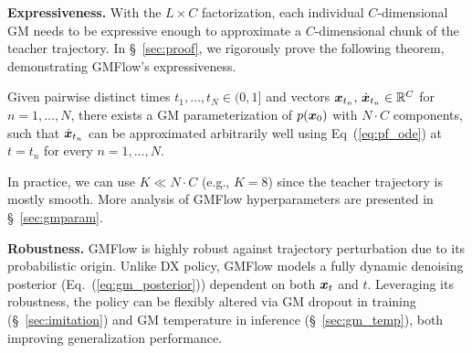 \textbf{Expressiveness.}
With the $L\times C$ factorization, each individual $C$-dimensional GM needs to be expressive enough to approximate a $C$-dimensional chunk of the teacher trajectory.
In \S~\ref{sec:proof}, we rigorously prove the following theorem, demonstrating GMFlow's expressiveness.
\begin{theorem}[A GMFlow policy with $K=N\cdot C$ can accurately approximate any $N$-step trajectory]
\label{the:gmode}
Given pairwise distinct times $t_1,\ldots,t_N\in(0,1]$ and vectors 
${\bm{x}}_{t_n},\,\dot{{\bm{x}}}_{t_n}\in\mathbb{R}^C$ for $n=1,\ldots,N$, there exists a GM parameterization of $p({\bm{x}}_0)$ with $N\cdot C$ components, such that $\dot{{\bm{x}}}_{t_n}$ can be approximated arbitrarily well using Eq~(\ref{eq:pf_ode}) at $t=t_n$ for every $n=1,\ldots,N$.
\end{theorem}
In practice, we can use $K\ll N \cdot C$ (e.g., $K=8$) since the teacher trajectory is mostly smooth. More analysis of GMFlow hyperparameters are presented in \S~\ref{sec:gmparam}.

\textbf{Robustness.}
GMFlow is highly robust against trajectory perturbation due to its probabilistic origin. Unlike DX policy, GMFlow models a fully dynamic denoising posterior (Eq.~(\ref{eq:gm_posterior})) dependent on both ${\bm{x}}_t$ and $t$. 
Leveraging its robustness, the policy can be flexibly altered via GM dropout in training (\S~\ref{sec:imitation}) and GM temperature in inference (\S~\ref{sec:gm_temp}), both improving generalization performance.
